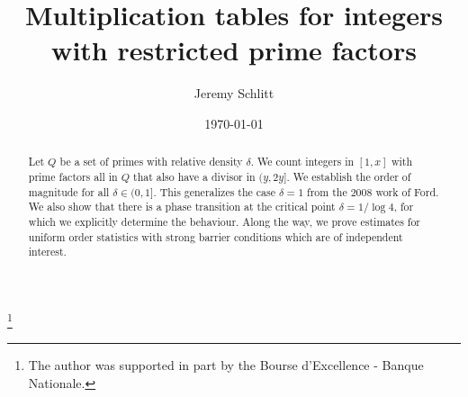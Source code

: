 \documentclass{amsart}
\theoremstyle{definition}
\numberwithin{equation}{section}
\newcommand{\density}{\delta}
\begin{document}
	
	\title[Multiplication tables with restricted prime factors]{Multiplication tables for integers with restricted prime factors}
	
	\author{Jeremy Schlitt}
	\address{D\'epartement de Math\'ematiques et de Statistique, Universit\'e de Montr\'eal, CP 6128 succ. centre, Centre Ville, Montr\'eal, Qc H3T 1J4, CANADA}
	\thanks{The author was supported in part by the Bourse d'Excellence - Banque Nationale.}
	
	
	
	\date{\today}
	
	
	
	\begin{abstract}
		Let $Q$ be a set of primes with relative density $\density$. We count integers in $[1,x]$ with prime factors all in $Q$ that also have a divisor in $(y,2y]$. We establish the order of magnitude for all $\density \in (0,1]$. This generalizes the case $\density = 1$ from the 2008 work of Ford. We also show that there is a phase transition at the critical point $\density = 1/\log 4$, for which we explicitly determine the behaviour. Along the way, we prove estimates for uniform order statistics with strong barrier conditions which are of independent interest.
	\end{abstract}
	\maketitle
	
	
	
	
	
\end{document}
